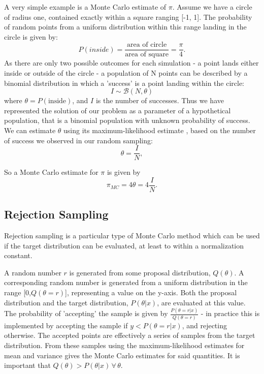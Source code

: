 \documentclass[a4paper,11pt,twoside]{article}
\begin{document}
A very simple example is a Monte Carlo estimate of $\pi$. Assume we have a
circle of radius one, contained exactly within a square ranging [-1, 1]. The
probability of random points from a uniform distribution within this range
landing in the circle is given by:
\begin{equation}
	P(inside) = \frac{\text{area of circle}}{\text{area of square}} =
	\frac{\pi}{4}.
\end{equation}
As there are only two possible outcomes for each simulation - a point lands
either inside or outside of the circle - a  population of N points can be
described by a binomial distribution in which a 'success' is a point landing within
the circle:
\begin{equation}
	I \sim \mathcal{B}(N, \theta)
\end{equation}
where $\theta = P(\text{inside})$, and $I$ is the number of successes.
Thus we have represented the solution of our problem as a parameter of a
hypothetical population, that is a binomial population with unknown probability
of success.
We can estimate $\theta$ using its maximum-likelihood estimate \cite{som}, based
on the number of success we observed in our random sampling:
\begin{equation}
	\theta = \frac{I}{N},
\end{equation}

So a Monte Carlo estimate for $\pi$ is given by
\begin{equation}
	\pi_{MC} = 4 \theta = 4 \frac{I}{N}.
\end{equation}

\subsection{Rejection Sampling}
Rejection sampling is a particular type of Monte Carlo method which can be used
if the target distribution can be evaluated, at least to within a normalization
constant. 

A random number $r$ is generated from some proposal distribution, $Q(\theta)$. A
corresponding random number is generated from a uniform distribution in the
range [0,$Q(\theta = r)$], representing a value on the y-axis. Both the
proposal distribution and the target distribution, $P(\theta|x)$, are
evaluated at this value. The probability of 'accepting' the sample is given by
$\frac{P(\theta = r|x)}{Q(\theta = r)}$ - in practice this is implemented by accepting the
sample if $y < P(\theta = r|x)$, and rejecting otherwise. The accepted points are
effectively a series of samples from the target distribution. From these
samples using the maximum-likelihood estimates for mean and variance gives the
Monte Carlo estimates for said quantities. It is important that $Q(\theta) >
P(\theta|x) \, \forall \, \theta$. 
\end{document}
